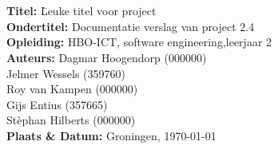 \documentclass[11pt,fleqn,oneside,openany]{book} %
\newcommand{\titleText}{Leuke titel voor project} %
\newcommand{\subtitleText}{Documentatie verslag van project 2.4} %
\newcommand{\authorText}{Dagmar Hoogendorp \\ Jelmer Wessels \\ Stèphan Hilbers \\ Roy van Kampen \\ Gijs Entius \\}
\begin{document}

\begingroup
\thispagestyle{empty}
\noindent{}\\
\vfill
\endgroup


\newpage
\thispagestyle{empty}

\noindent{}\\

\begin{tabbing}
    \textbf{Titel:} \hspace{2cm} \= \titleText \\
    \textbf{Ondertitel:} \> \subtitleText \\
    \textbf{Opleiding:} \> HBO-ICT, software engineering,leerjaar 2 \\
    \textbf{Auteurs:} \> Dagmar Hoogendorp (000000) \\
    \> Jelmer Wessels (359760) \\
    \> Roy van Kampen (000000) \\
    \> Gijs Entius (357665) \\
    \> Stèphan Hilberts (000000) \\
    \textbf{Plaats \& Datum:} \> Groningen, \today 
\end{tabbing}

\end{document}
